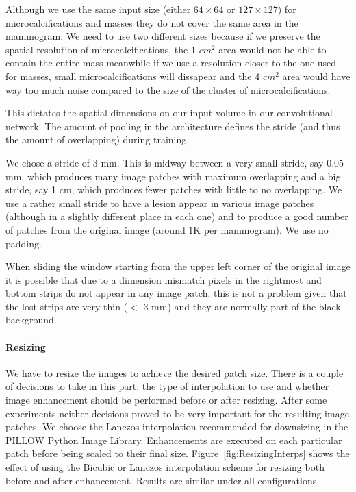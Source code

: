 Although we use the same input size (either $64 \times 64$ or $127 \times 127$) for microcalcifications and masses they do not cover the same area in the mammogram. We need to use two different sizes because if we preserve the spatial resolution of microcalcifications, the 1 $cm^2$ area would not be able to contain the entire mass meanwhile if we use a resolution closer to the one used for masses, small microcalcifications will dissapear and the 4 $cm^2$ area would have way too much noise compared to the size of the cluster of microcalcifications.

This dictates the spatial dimensions on our input volume in our convolutional network. The amount of pooling in the architecture defines the stride (and thus the amount of overlapping) during training.

We chose a stride of 3 mm. This is midway between a very small stride, say 0.05 mm, which produces many image patches with maximum overlapping and a big stride, say 1 cm, which produces fewer patches with little to no overlapping. We use a rather small stride to have a lesion appear in various image patches (although in a slightly different place in each one) and to produce a good number of patches from the original image (around 1K per mammogram). We use no padding.

When sliding the window starting from the upper left corner of the original image it is possible that due to a dimension mismatch pixels in the rightmost and bottom strips do not appear in any image patch, this is not a problem given that the lost strips are very thin ($<$ 3 mm) and they are normally part of the black background.

\paragraph{Resizing}
We have to resize the images to achieve the desired patch size. There is a couple of decisions to take in this part: the type of interpolation to use and whether image enhancement should be performed before or after resizing. After some experiments neither decisions proved to be very important for the resulting image patches. We choose the Lanczos interpolation recommended for downsizing in the PILLOW Python Image Library. Enhancements are executed on each particular patch before being scaled to their final size. Figure~\ref{fig:ResizingInterps} shows the effect of using the Bicubic or Lanczos interpolation scheme for resizing both before and after enhancement. Results are similar under all configurations.


